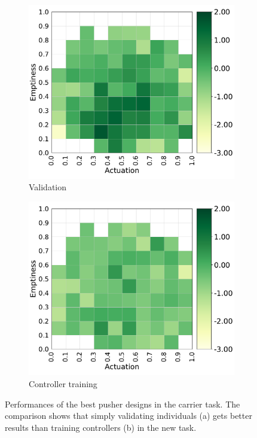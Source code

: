 \begin{figure}[h]
    \centering
    \begin{subfigure}[b]{0.49\textwidth}
         \centering
         \includegraphics[scale=0.4]{images/multitasking/pusher_val_c.pdf}
         \caption{Validation}
    \end{subfigure}
    \hfill
    \begin{subfigure}[b]{0.49\textwidth}
         \centering
         \includegraphics[scale=0.4]{images/multitasking/pusher_tr_c.pdf}
         \caption{Controller training}
    \end{subfigure}
    \caption{Performances of the best pusher designs in the carrier task. The comparison shows that simply validating individuals (a) gets better results than training controllers (b) in the new task.}
    \label{fig:pusher_val_tr}
 \end{figure}
 
